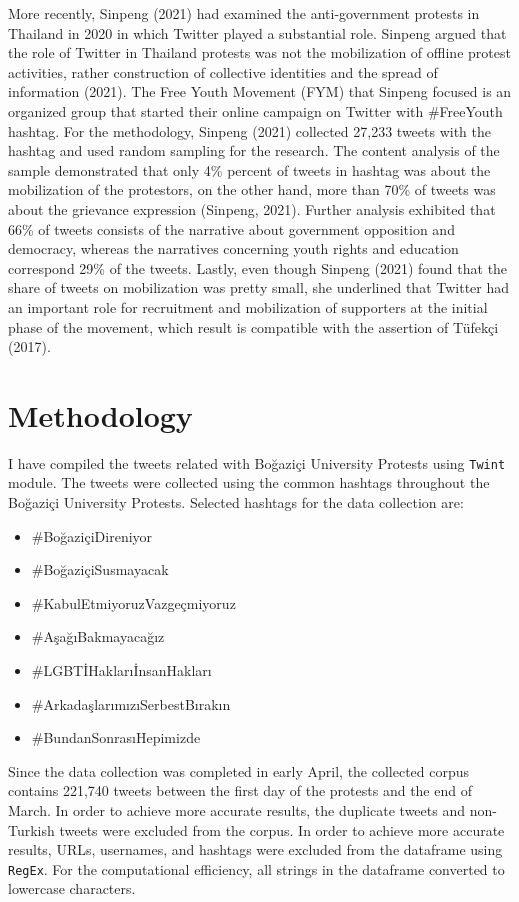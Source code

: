 \documentclass[a4paper]{article}
\begin{document}
More recently, Sinpeng (2021) had examined the anti-government protests in Thailand in 2020 in which Twitter played a substantial role. Sinpeng argued that the role of Twitter in Thailand protests was not the mobilization of offline protest activities, rather construction of collective identities and the spread of information (2021). The Free Youth Movement (FYM) that Sinpeng focused is an organized group that started their online campaign on Twitter with \#FreeYouth hashtag. For the methodology, Sinpeng (2021) collected 27,233 tweets with the hashtag and used random sampling for the research. The content analysis of the sample demonstrated that only 4\% percent of tweets in hashtag was about the mobilization of the protestors, on the other hand, more than 70\% of tweets was about the grievance expression (Sinpeng, 2021). Further analysis exhibited that 66\% of tweets consists of the narrative about government opposition and democracy, whereas the narratives concerning youth rights and education correspond 29\% of the tweets. Lastly, even though Sinpeng (2021) found that the share of tweets on mobilization was pretty small, she underlined that Twitter had an important role for recruitment and mobilization of supporters at the initial phase of the movement, which result is compatible with the assertion of Tüfekçi (2017).

\section{Methodology}

I have compiled the tweets related with Boğaziçi University Protests using \verb|Twint| module. The tweets were collected using the common hashtags throughout the Boğaziçi University Protests. Selected hashtags for the data collection are:
\begin{itemize}
    \item \#BoğaziçiDireniyor
    \item \#BoğaziçiSusmayacak
    \item \#KabulEtmiyoruzVazgeçmiyoruz
    \item \#AşağıBakmayacağız
    \item \#LGBTİHaklarıİnsanHakları
    \item \#ArkadaşlarımızıSerbestBırakın
    \item \#BundanSonrasıHepimizde
\end{itemize}
Since the data collection was completed in early April, the collected corpus contains 221,740 tweets between the first day of the protests and the end of March. In order to achieve more accurate results, the duplicate tweets and non-Turkish tweets were excluded from the corpus. In order to achieve more accurate results, URLs, usernames, and hashtags were excluded from the dataframe using \verb|RegEx|. For the computational efficiency, all strings in the dataframe converted to lowercase characters. \\
	
\end{document}

